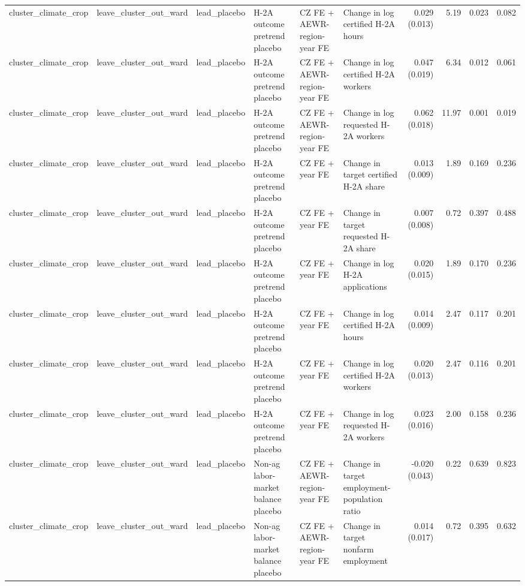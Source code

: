 \begin{tabular}{llllllrrrr}
cluster_climate_crop & leave_cluster_out_ward & lead_placebo & H-2A outcome pretrend placebo & CZ FE + AEWR-region-year FE & Change in log certified H-2A hours & 0.029 (0.013) & 5.19 & 0.023 & 0.082 \\
cluster_climate_crop & leave_cluster_out_ward & lead_placebo & H-2A outcome pretrend placebo & CZ FE + AEWR-region-year FE & Change in log certified H-2A workers & 0.047 (0.019) & 6.34 & 0.012 & 0.061 \\
cluster_climate_crop & leave_cluster_out_ward & lead_placebo & H-2A outcome pretrend placebo & CZ FE + AEWR-region-year FE & Change in log requested H-2A workers & 0.062 (0.018) & 11.97 & 0.001 & 0.019 \\
cluster_climate_crop & leave_cluster_out_ward & lead_placebo & H-2A outcome pretrend placebo & CZ FE + year FE & Change in target certified H-2A share & 0.013 (0.009) & 1.89 & 0.169 & 0.236 \\
cluster_climate_crop & leave_cluster_out_ward & lead_placebo & H-2A outcome pretrend placebo & CZ FE + year FE & Change in target requested H-2A share & 0.007 (0.008) & 0.72 & 0.397 & 0.488 \\
cluster_climate_crop & leave_cluster_out_ward & lead_placebo & H-2A outcome pretrend placebo & CZ FE + year FE & Change in log H-2A applications & 0.020 (0.015) & 1.89 & 0.170 & 0.236 \\
cluster_climate_crop & leave_cluster_out_ward & lead_placebo & H-2A outcome pretrend placebo & CZ FE + year FE & Change in log certified H-2A hours & 0.014 (0.009) & 2.47 & 0.117 & 0.201 \\
cluster_climate_crop & leave_cluster_out_ward & lead_placebo & H-2A outcome pretrend placebo & CZ FE + year FE & Change in log certified H-2A workers & 0.020 (0.013) & 2.47 & 0.116 & 0.201 \\
cluster_climate_crop & leave_cluster_out_ward & lead_placebo & H-2A outcome pretrend placebo & CZ FE + year FE & Change in log requested H-2A workers & 0.023 (0.016) & 2.00 & 0.158 & 0.236 \\
cluster_climate_crop & leave_cluster_out_ward & lead_placebo & Non-ag labor-market balance placebo & CZ FE + AEWR-region-year FE & Change in target employment-population ratio & -0.020 (0.043) & 0.22 & 0.639 & 0.823 \\
cluster_climate_crop & leave_cluster_out_ward & lead_placebo & Non-ag labor-market balance placebo & CZ FE + AEWR-region-year FE & Change in target nonfarm employment & 0.014 (0.017) & 0.72 & 0.395 & 0.632 \\

\end{tabular}
